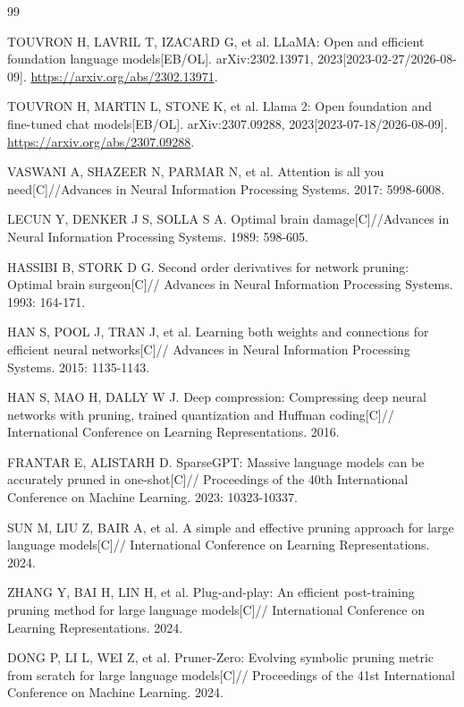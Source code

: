 \begin{thebibliography}{99}
\scriptsize
\setlength{\itemsep}{-3pt}
\setlength{\parsep}{0pt}

TOUVRON H, LAVRIL T, IZACARD G, et al.
LLaMA: Open and efficient foundation language models[EB/OL].
arXiv:2302.13971, 2023[2023-02-27/2026-08-09].
\url{https://arxiv.org/abs/2302.13971}.

TOUVRON H, MARTIN L, STONE K, et al.
Llama 2: Open foundation and fine-tuned chat models[EB/OL].
arXiv:2307.09288, 2023[2023-07-18/2026-08-09].
\url{https://arxiv.org/abs/2307.09288}.

VASWANI A, SHAZEER N, PARMAR N, et al.
Attention is all you need[C]//Advances in Neural Information Processing Systems.
2017: 5998-6008.

LECUN Y, DENKER J S, SOLLA S A.
Optimal brain damage[C]//Advances in Neural Information Processing Systems.
1989: 598-605.

HASSIBI B, STORK D G.
Second order derivatives for network pruning: Optimal brain surgeon[C]//
Advances in Neural Information Processing Systems.
1993: 164-171.

HAN S, POOL J, TRAN J, et al.
Learning both weights and connections for efficient neural networks[C]//
Advances in Neural Information Processing Systems.
2015: 1135-1143.

HAN S, MAO H, DALLY W J.
Deep compression: Compressing deep neural networks with pruning, trained quantization and Huffman coding[C]//
International Conference on Learning Representations.
2016.

FRANTAR E, ALISTARH D.
SparseGPT: Massive language models can be accurately pruned in one-shot[C]//
Proceedings of the 40th International Conference on Machine Learning.
2023: 10323-10337.

SUN M, LIU Z, BAIR A, et al.
A simple and effective pruning approach for large language models[C]//
International Conference on Learning Representations.
2024.

ZHANG Y, BAI H, LIN H, et al.
Plug-and-play: An efficient post-training pruning method for large language models[C]//
International Conference on Learning Representations.
2024.

DONG P, LI L, WEI Z, et al.
Pruner-Zero: Evolving symbolic pruning metric from scratch for large language models[C]//
Proceedings of the 41st International Conference on Machine Learning.
2024.


\end{thebibliography}
